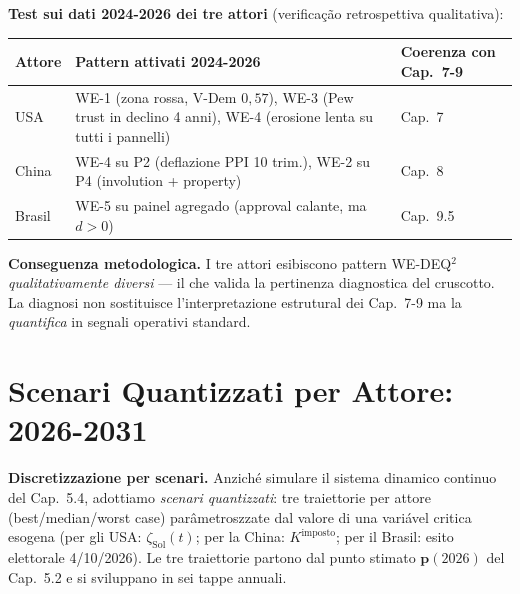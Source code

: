 \Proved{} \textbf{Test sui dati 2024-2026 dei tre attori} (verificação
retrospettiva qualitativa):

{\def\LTcaptype{none} %
{\small\begin{longtable}[]{@{}
  >{\raggedright\arraybackslash}p{}
  >{\raggedright\arraybackslash}p{}
  >{\raggedright\arraybackslash}p{}@{}}
\toprule\noalign{}
\begin{minipage}[b]{\linewidth}\raggedright
Attore
\end{minipage} & \begin{minipage}[b]{\linewidth}\raggedright
Pattern attivati 2024-2026
\end{minipage} & \begin{minipage}[b]{\linewidth}\raggedright
Coerenza con Cap.~7-9
\end{minipage} \\
\midrule\noalign{}
\endhead
\bottomrule\noalign{}
\endlastfoot
USA & WE-1 (zona rossa, V-Dem \(0{,}57\)), WE-3 (Pew trust in declino 4
anni), WE-4 (erosione lenta su tutti i pannelli) & \Proved{} Cap.~7 \\
China & WE-4 su P2 (deflazione PPI 10 trim.), WE-2 su P4 (involution +
property) & \Proved{} Cap.~8 \\
Brasil & WE-5 su painel agregado (approval calante, ma \(d > 0\)) &
\Proved{} Cap.~9.5 \\
\end{longtable}}
}

\Hypoth{} \textbf{Conseguenza metodologica.} I tre attori esibiscono
pattern WE-DEQ$^2$ \emph{qualitativamente diversi} --- il che valida la
pertinenza diagnostica del cruscotto. La diagnosi non sostituisce
l'interpretazione estrutural dei Cap.~7-9 ma la \emph{quantifica} in
segnali operativi standard.



\section{Scenari Quantizzati per Attore:
2026-2031}\label{scenari-quantizzati-per-attore-2026-2031}

\Hypoth{} \textbf{Discretizzazione per scenari.} Anziché simulare il
sistema dinamico continuo del Cap.~5.4, adottiamo \emph{scenari
quantizzati}: tre traiettorie per attore (best/median/worst case)
parâmetroszzate dal valore di una variável critica esogena (per gli USA:
\(\zeta_{\text{Sol}}(t)\); per la China: \(K^{\text{imposto}}\); per il
Brasil: esito elettorale 4/10/2026). Le tre traiettorie partono dal
punto stimato \(\boldsymbol{p}(2026)\) del Cap.~5.2 e si sviluppano in
sei tappe annuali.

